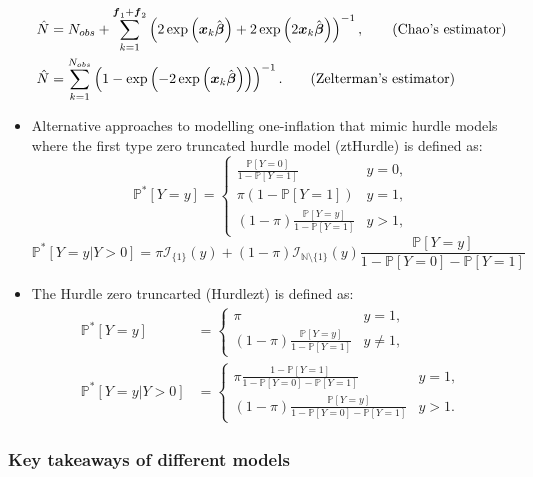 \documentclass[
]{jss}
\newcommand{\1}{\mathcal{I}} \newcommand{\bx}{\boldsymbol{x}}
\begin{document}
\begin{itemize}
\begin{align}
        \hat{N} &= N_{obs}+
        \sum_{k=1}^{\boldsymbol{f}_{1}+\boldsymbol{f}_{2}}
        \left(2\exp\left(\boldsymbol{x}_{k}\hat{\boldsymbol{\beta}}\right)+
        2\exp\left(2\boldsymbol{x}_{k}\hat{\boldsymbol{\beta}}\right)\right)^{-1},
        \tag{\text{Chao's estimator}}\\
        \hat{N}&=\sum_{k=1}^{N_{obs}}
        \left(1-\exp\left(-2\exp\left(\boldsymbol{x}_{k}\hat{\boldsymbol{\beta}}\right)\right)\right)^{-1}.
        \tag{\text{Zelterman's estimator}}
    \end{align}
    \item Alternative approaches to modelling one-inflation that mimic hurdle models where the first type zero truncated hurdle model (ztHurdle) is defined as:
    \begin{equation*}
        \mathbb{P}^{\ast}[Y=y]=\begin{cases}
        \frac{\mathbb{P}[Y=0]}{1-\mathbb{P}[Y=1]} & y=0, \\
        \pi(1-\mathbb{P}[Y=1]) & y=1, \\
        (1-\pi) \frac{\mathbb{P}[Y=y]}{1-\mathbb{P}[Y=1]} & y>1,
        \end{cases}
    \end{equation*}
    \begin{equation*}
        \mathbb{P}^{\ast}[Y=y|Y>0]=\pi\mathcal{I}_{\{1\}}(y)+
        (1-\pi)\mathcal{I}_{\mathbb{N}\setminus\{1\}}(y)\frac{\mathbb{P}[Y=y]}{1-\mathbb{P}[Y=0]-\mathbb{P}[Y=1]}
    \end{equation*}
    \item The Hurdle zero truncarted (Hurdlezt) is defined as:
    \begin{align*}
        \mathbb{P}^{\ast}[Y=y]&=\begin{cases}
        \pi & y=1, \\
        (1-\pi) \frac{\mathbb{P}[Y=y]}{1-\mathbb{P}[Y=1]} & y\neq1,
        \end{cases}\\
        \mathbb{P}^{\ast}[Y=y|Y>0]&=\begin{cases}
            \pi\frac{1-\mathbb{P}[Y=1]}{1-\mathbb{P}[Y=0]-\mathbb{P}[Y=1]} & y=1,\\
            (1-\pi)\frac{\mathbb{P}[Y=y]}{1-\mathbb{P}[Y=0]-\mathbb{P}[Y=1]} & y>1.
        \end{cases}
    \end{align*}
\end{itemize}

\subsubsection{Key takeaways of different
models}\label{key-takeaways-of-different-models}
\end{document}
